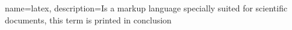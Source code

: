 \makeglossaries

{
    name=latex,
    description={Is a markup language specially suited 
    for scientific documents, this term is printed in conclusion }
}